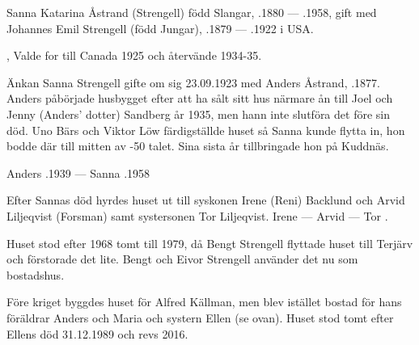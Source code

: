 %
Sanna Katarina Åstrand (Strengell) född Slangar, .1880 --- .1958, gift med Johannes Emil Strengell (född Jungar), .1879 --- .1922  i USA.
\begin{jhchildren}
  \item {}
  \item {}
  \item {}, Valde for till Canada 1925 och återvände 1934-35.
\end{jhchildren}
Änkan Sanna Strengell gifte om sig 23.09.1923 med Anders Åstrand, .1877. Anders påbörjade husbygget efter att ha sålt sitt hus närmare ån till Joel och Jenny (Anders' dotter) Sandberg år 1935, men hann inte slutföra det före sin död. Uno Bärs och Viktor Löw färdigställde huset så Sanna kunde flytta in, hon bodde där till mitten av -50 talet. Sina sista år tillbringade hon på Kuddnäs.

Anders .1939  ---  Sanna .1958

Efter Sannas död hyrdes huset ut till syskonen Irene (Reni) Backlund och Arvid Liljeqvist (Forsman) samt systersonen Tor Liljeqvist. Irene	  ---  Arvid   ---  Tor	.

Huset stod efter 1968 tomt till 1979, då Bengt Strengell flyttade huset till Terjärv och förstorade det lite. Bengt och Eivor Strengell använder det nu som bostadshus.


%


Före kriget byggdes huset för Alfred Källman, men blev istället bostad för hans föräldrar Anders och Maria och systern Ellen (se ovan). Huset stod tomt efter Ellens död 31.12.1989 och revs 2016.\jhvspace{}




%




